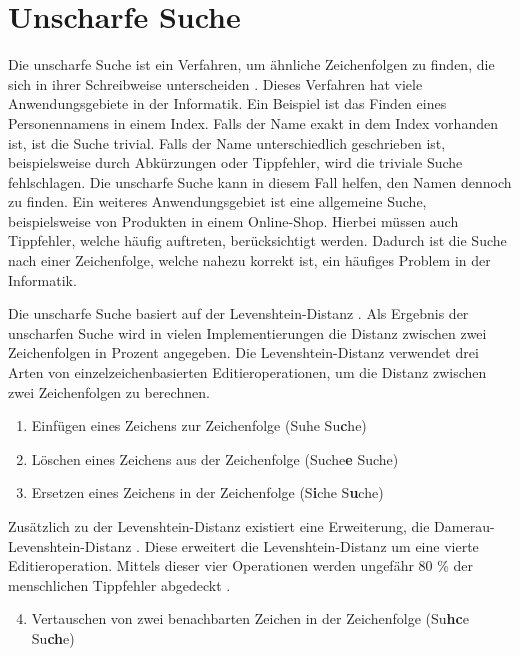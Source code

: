 \section{Unscharfe Suche}
\label{sec:unscharfe-suche}
Die unscharfe Suche ist ein Verfahren, um ähnliche Zeichenfolgen zu finden, die sich in ihrer Schreibweise unterscheiden \autocite{hall_approximate_1980}.
Dieses Verfahren hat viele Anwendungsgebiete in der Informatik.
Ein Beispiel ist das Finden eines Personennamens in einem Index.
Falls der Name exakt in dem Index vorhanden ist, ist die Suche trivial.
Falls der Name unterschiedlich geschrieben ist, beispielsweise durch Abkürzungen oder Tippfehler, wird die triviale Suche fehlschlagen.
Die unscharfe Suche kann in diesem Fall helfen, den Namen dennoch zu finden.
Ein weiteres Anwendungsgebiet ist eine allgemeine Suche, beispielsweise von Produkten in einem Online-Shop.
Hierbei müssen auch Tippfehler, welche häufig auftreten, berücksichtigt werden.
Dadurch ist die Suche nach einer Zeichenfolge, welche nahezu korrekt ist, ein häufiges Problem in der Informatik.

Die unscharfe Suche basiert auf der Levenshtein-Distanz \autocite{levenshtein_binary_1965}.
Als Ergebnis der unscharfen Suche wird in vielen Implementierungen die Distanz zwischen zwei Zeichenfolgen in Prozent angegeben.
Die Levenshtein-Distanz verwendet drei Arten von einzelzeichenbasierten Editieroperationen, um die Distanz zwischen zwei Zeichenfolgen zu berechnen.

\begin{enumerate}
    \item Einfügen eines Zeichens zur Zeichenfolge (Suhe \rightarrow{} Su\textbf{c}he)
    \item Löschen eines Zeichens aus der Zeichenfolge (Suche\textbf{e} \rightarrow{} Suche)
    \item Ersetzen eines Zeichens in der Zeichenfolge (S\textbf{i}che \rightarrow{} S\textbf{u}che)
\end{enumerate}

Zusätzlich zu der Levenshtein-Distanz existiert eine Erweiterung, die Damerau-Levenshtein-Distanz \autocite{damerau_technique_1964}.
Diese erweitert die Levenshtein-Distanz um eine vierte Editieroperation.
Mittels dieser vier Operationen werden ungefähr 80 \% der menschlichen Tippfehler abgedeckt \autocite{damerau_technique_1964}.

\begin{enumerate}
    \setcounter{enumi}{3}
    \item Vertauschen von zwei benachbarten Zeichen in der Zeichenfolge (Su\textbf{hc}e \rightarrow{} Su\textbf{ch}e)
\end{enumerate}

